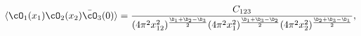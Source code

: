 \begin{equation} \label{3pt}
\langle \cO_{1}(x_1) \cO_{2}(x_2) \bar\cO_{3}(0) \rangle  =
\frac{C_{123} }
{(4\pi^2 x_{12}^2)^{\frac{\D_1+\D_2 -\D_3}{2}}
 (4\pi^2 x_{1}^2)^{\frac{\D_1+\D_3 -\D_2}{2}}
 (4\pi^2 x_{2}^2)^{\frac{\D_2+\D_3 -\D_1}{2}}},
\end{equation}

